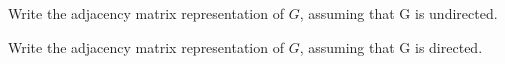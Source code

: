 \begin{prob}
\begin{subprobset}
\begin{subprob}
        \end{subprob}

        \begin{subprob}
            Write the adjacency matrix representation of $G$, assuming that G is undirected.
        \end{subprob}

        \begin{subprob}
            Write the adjacency matrix representation of $G$, assuming that G is directed.
        \end{subprob}

    \end{subprobset}
\end{prob}
